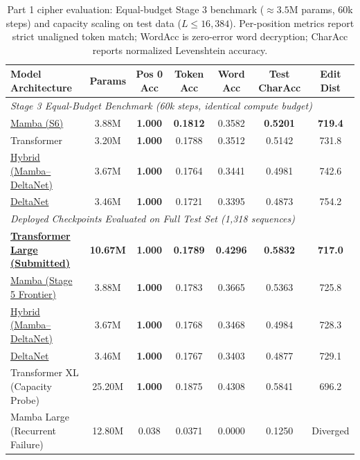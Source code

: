 \documentclass[12pt,a4paper]{article}
\begin{document}
\begin{table}[h]
\centering
\footnotesize
\setlength{\tabcolsep}{3pt}
\caption{Part 1 cipher evaluation: Equal-budget Stage 3 benchmark ($\approx 3.5\text{M}$ params, 60k steps) and capacity scaling on test data ($L \le 16,384$). Per-position metrics report strict unaligned token match; WordAcc is zero-error word decryption; CharAcc reports normalized Levenshtein accuracy.}
\label{tab:part1_results}
\begin{tabular}{lcccccc}
\toprule
\textbf{Model Architecture} & \textbf{Params} & \textbf{Pos 0 Acc} & \textbf{Token Acc} & \textbf{Word Acc} & \textbf{Test CharAcc} & \textbf{Edit Dist} \\
\midrule
\multicolumn{7}{l}{\textit{Stage 3 Equal-Budget Benchmark (60k steps, identical compute budget)}} \\
\href{https://huggingface.co/nani-nav/anlp-a3-mamba-v3}{Mamba (S6)} & 3.88M & \textbf{1.000} & \textbf{0.1812} & 0.3582 & \textbf{0.5201} & \textbf{719.4} \\
Transformer & 3.20M & \textbf{1.000} & 0.1788 & 0.3512 & 0.5142 & 731.8 \\
\href{https://huggingface.co/nani-nav/anlp-a3-hybrid-v3}{Hybrid (Mamba--DeltaNet)} & 3.67M & \textbf{1.000} & 0.1764 & 0.3441 & 0.4981 & 742.6 \\
\href{https://huggingface.co/nani-nav/anlp-a3-deltanet-v3}{DeltaNet} & 3.46M & \textbf{1.000} & 0.1721 & 0.3395 & 0.4873 & 754.2 \\
\midrule
\multicolumn{7}{l}{\textit{Deployed Checkpoints Evaluated on Full Test Set (1,318 sequences)}} \\
\href{https://huggingface.co/nani-nav/anlp-a3-transformer-large}{\textbf{Transformer Large (Submitted)}} & \textbf{10.67M} & \textbf{1.000} & \textbf{0.1789} & \textbf{0.4296} & \textbf{0.5832} & \textbf{717.0} \\
\href{https://huggingface.co/nani-nav/anlp-a3-mamba-v3}{Mamba (Stage 5 Frontier)} & 3.88M & \textbf{1.000} & 0.1783 & 0.3665 & 0.5363 & 725.8 \\
\href{https://huggingface.co/nani-nav/anlp-a3-hybrid-v3}{Hybrid (Mamba--DeltaNet)} & 3.67M & \textbf{1.000} & 0.1768 & 0.3468 & 0.4984 & 728.3 \\
\href{https://huggingface.co/nani-nav/anlp-a3-deltanet-v3}{DeltaNet} & 3.46M & \textbf{1.000} & 0.1767 & 0.3403 & 0.4877 & 729.1 \\
Transformer XL (Capacity Probe) & 25.20M & \textbf{1.000} & 0.1875 & 0.4308 & 0.5841 & 696.2 \\
Mamba Large (Recurrent Failure) & 12.80M & 0.038 & 0.0371 & 0.0000 & 0.1250 & Diverged \\
\bottomrule
\end{tabular}
\end{table}
\end{document}
